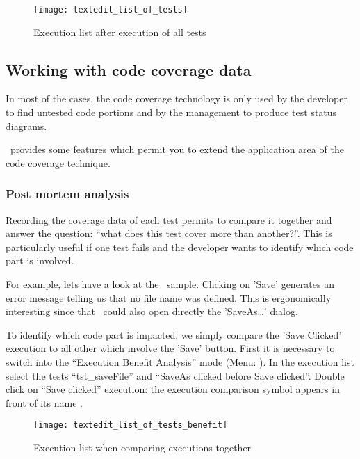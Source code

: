 \begin{figure}[H]
  \begin{center}
    \texttt{[image: textedit\_list\_of\_tests]}
  \end{center}
  \caption{Execution list after execution of all tests}
  \label{fig:execlist1}
\end{figure}


\subsection{Working with code coverage data}

In most of the cases, the code coverage technology is only used by the
developer to find untested code portions and by the management to produce test
status diagrams. 

\TestCocoon\ provides some features which permit you to extend the application
area of the code coverage technique.


\subsubsection{Post mortem analysis}

Recording the coverage data of each test permits to compare it together and
answer the question: ``what does this test cover more than another?''. This is
particularly useful if one test fails and the developer wants to identify which
code part is involved.

For example, lets have a look at the \TextEdit\ sample. Clicking on '\textsf{Save}' generates
an error message telling us that no file name was defined. This is ergonomically
interesting since that
\TextEdit\ could also open directly the '\textsf{SaveAs\ldots}' dialog. 

To identify which code part is impacted, we simply compare the '\textsf{Save Clicked}'
execution to all other which involve the '\textsf{Save}' button. First it is necessary
to switch into the ``Execution Benefit Analysis'' mode
(Menu: ). In the execution list select
the tests ``\textsf{tst\_saveFile}'' and ``\textsf{SaveAs clicked before Save clicked}''. Double
click on ``\textsf{Save clicked}'' execution: the execution comparison symbol appears in
front of its name .

\begin{figure}[H]
  \begin{center}
    \texttt{[image: textedit\_list\_of\_tests\_benefit]}
  \end{center}
  \caption{Execution list when comparing executions together}
  \label{fig:execlist2}
\end{figure}

